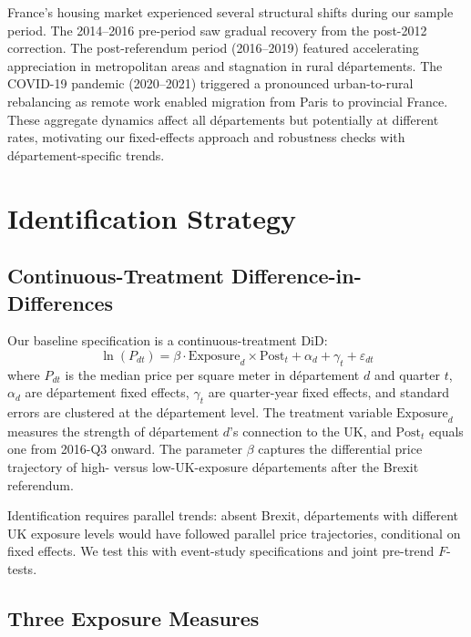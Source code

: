 \documentclass[12pt]{article}
\begin{document}
France's housing market experienced several structural shifts during our sample period. The 2014--2016 pre-period saw gradual recovery from the post-2012 correction. The post-referendum period (2016--2019) featured accelerating appreciation in metropolitan areas and stagnation in rural d\'epartements. The COVID-19 pandemic (2020--2021) triggered a pronounced urban-to-rural rebalancing as remote work enabled migration from Paris to provincial France. These aggregate dynamics affect all d\'epartements but potentially at different rates, motivating our fixed-effects approach and robustness checks with d\'epartement-specific trends.


\section{Identification Strategy}\label{sec:identification}

\subsection{Continuous-Treatment Difference-in-Differences}

Our baseline specification is a continuous-treatment DiD:
\begin{equation}\label{eq:baseline}
\ln(P_{dt}) = \beta \cdot \text{Exposure}_d \times \text{Post}_t + \alpha_d + \gamma_t + \varepsilon_{dt}
\end{equation}
where $P_{dt}$ is the median price per square meter in d\'epartement $d$ and quarter $t$, $\alpha_d$ are d\'epartement fixed effects, $\gamma_t$ are quarter-year fixed effects, and standard errors are clustered at the d\'epartement level. The treatment variable $\text{Exposure}_d$ measures the strength of d\'epartement $d$'s connection to the UK, and $\text{Post}_t$ equals one from 2016-Q3 onward. The parameter $\beta$ captures the differential price trajectory of high- versus low-UK-exposure d\'epartements after the Brexit referendum.

Identification requires parallel trends: absent Brexit, d\'epartements with different UK exposure levels would have followed parallel price trajectories, conditional on fixed effects. We test this with event-study specifications and joint pre-trend $F$-tests.

\subsection{Three Exposure Measures}
\end{document}
